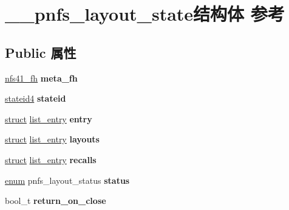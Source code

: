 \hypertarget{struct____pnfs__layout__state}{}\section{\+\_\+\+\_\+pnfs\+\_\+layout\+\_\+state结构体 参考}
\label{struct____pnfs__layout__state}
\subsection*{Public 属性}
\begin{DoxyCompactItemize}
\item 
\mbox{\label{struct____pnfs__layout__state_a901e328afc46b041d1ccc3128658443a}} 
\hyperlink{struct____nfs41__fh}{nfs41\+\_\+fh} {\bfseries meta\+\_\+fh}
\item 
\mbox{\label{struct____pnfs__layout__state_a30545e7194483df7de7fa052d54637cb}} 
\hyperlink{struct____stateid4}{stateid4} {\bfseries stateid}
\item 
\mbox{\label{struct____pnfs__layout__state_a54e3655ada9ab5e7d9f3ea8321b3f6c0}} 
\hyperlink{interfacestruct}{struct} \hyperlink{structlist__entry}{list\+\_\+entry} {\bfseries entry}
\item 
\mbox{\label{struct____pnfs__layout__state_ab97911ae560f16b0b66f4983ecddb05c}} 
\hyperlink{interfacestruct}{struct} \hyperlink{structlist__entry}{list\+\_\+entry} {\bfseries layouts}
\item 
\mbox{\label{struct____pnfs__layout__state_aa0cfaa595214dbb3c531cf625b270d94}} 
\hyperlink{interfacestruct}{struct} \hyperlink{structlist__entry}{list\+\_\+entry} {\bfseries recalls}
\item 
\mbox{\label{struct____pnfs__layout__state_a413699eac9fea1a3b6f9209a868e407f}} 
\hyperlink{interfaceenum}{enum} pnfs\+\_\+layout\+\_\+status {\bfseries status}
\item 
\mbox{\label{struct____pnfs__layout__state_a7b9ab431c9225202d960fb3be6997d26}} 
bool\+\_\+t {\bfseries return\+\_\+on\+\_\+close}

\end{DoxyCompactItemize}
